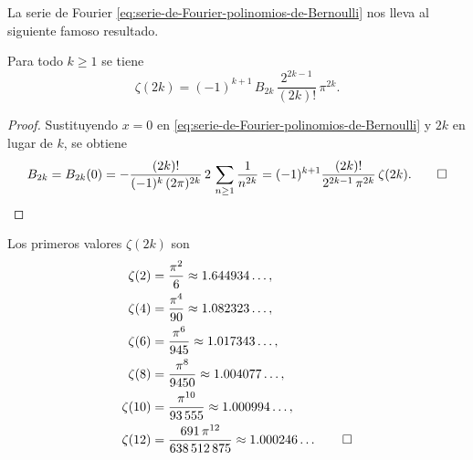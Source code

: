La serie de Fourier \eqref{eq:serie-de-Fourier-polinomios-de-Bernoulli} nos
lleva al siguiente famoso resultado.

\begin{teorema}[Euler]
  Para todo $k\ge 1$ se tiene
  $$\zeta (2k) = (-1)^{k+1} \, B_{2k}\,\frac{2^{2k-1}}{(2k)!}\,\pi^{2k}.$$

  \begin{proof}
    Sustituyendo $x = 0$ en \eqref{eq:serie-de-Fourier-polinomios-de-Bernoulli}
    y $2k$ en lugar de $k$, se obtiene
    \[ B_{2k} = B_{2k} (0) =
       -\frac{(2k)!}{(-1)^k\,(2\pi)^{2k}} \, 2\,\sum_{n \ge 1} \frac{1}{n^{2k}} =
       (-1)^{k+1}\frac{(2k)!}{2^{2k-1}\,\pi^{2k}}\,\zeta (2k). \qedhere \]
    \end{proof}
\end{teorema}

\begin{ejemplo}
  Los primeros valores $\zeta (2k)$ son
  \begin{align*}
    \zeta (2) & = \frac{\pi^2}{6} \approx 1.644934\ldots, \\
    \zeta (4) & = \frac{\pi^4}{90} \approx 1.082323\ldots, \\
    \zeta (6) & = \frac{\pi^6}{945}  \approx 1.017343\ldots, \\
    \zeta (8) & = \frac{\pi^8}{9450} \approx 1.004077\ldots, \\
    \zeta (10) & = \frac{\pi^{10}}{93\,555} \approx 1.000994\ldots, \\
    \zeta (12) & = \frac{691\,\pi^{12}}{638\,512\,875} \approx 1.000246\ldots \qedhere
  \end{align*}
\end{ejemplo}

